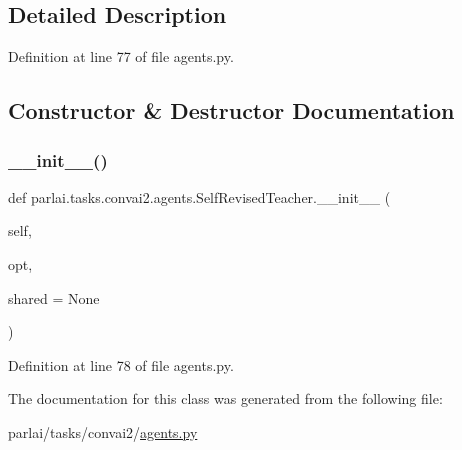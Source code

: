 \subsection{Detailed Description}


Definition at line 77 of file agents.\+py.



\subsection{Constructor \& Destructor Documentation}
\mbox{\label{classparlai_1_1tasks_1_1convai2_1_1agents_1_1SelfRevisedTeacher_a7e0e99704aa5772d371e1b03dfe5cf5a}} 
\subsubsection{\texorpdfstring{\+\_\+\+\_\+init\+\_\+\+\_\+()}{\_\_init\_\_()}}
{\footnotesize\ttfamily def parlai.\+tasks.\+convai2.\+agents.\+Self\+Revised\+Teacher.\+\_\+\+\_\+init\+\_\+\+\_\+ (\begin{DoxyParamCaption}\item[{}]{self,  }\item[{}]{opt,  }\item[{}]{shared = {\ttfamily None} }\end{DoxyParamCaption})}



Definition at line 78 of file agents.\+py.



The documentation for this class was generated from the following file\+:\begin{DoxyCompactItemize}
\item 
parlai/tasks/convai2/\hyperlink{parlai_2tasks_2convai2_2agents_8py}{agents.\+py}\end{DoxyCompactItemize}
